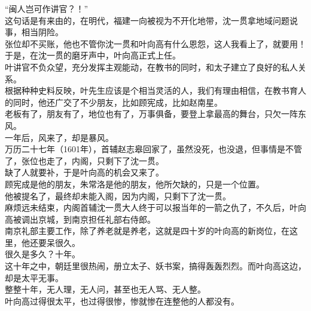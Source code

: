 \begin{multicols}{\theparacolNo}
“闽人岂可作讲官？！”\\

这句话是有来由的，在明代，福建一向被视为不开化地带，沈一贯拿地域问题说事，相当阴险。\\

张位却不买账，他也不管你沈一贯和叶向高有什么恩怨，这人我看上了，就要用！\\

于是，在沈一贯的磨牙声中，叶向高正式上任。\\

叶讲官不负众望，充分发挥主观能动，在教书的同时，和太子建立了良好的私人关系。\\

根据种种史料反映，叶先生应该是个相当灵活的人，我们有理由相信，在教书育人的同时，他还广交了不少朋友，比如顾宪成，比如赵南星。\\

老板有了，朋友有了，地位也有了，万事俱备，要登上拿最高的舞台，只欠一阵东风。\\

一年后，风来了，却是暴风。\\

万历二十七年（1601年），首辅赵志皋回家了，虽然没死，也没退，但事情是不管了，张位也走了，内阁，只剩下了沈一贯。\\

缺了人就要补，于是叶向高的机会又来了。\\

顾宪成是他的朋友，朱常洛是他的朋友，他所欠缺的，只是一个位置。\\

他被提名了，最终却未能入阁，因为内阁，只剩下了沈一贯。\\

麻烦远未结束，内阁首辅沈一贯大人终于可以报当年的一箭之仇了，不久后，叶向高被调出京城，到南京担任礼部右侍郎。\\

南京礼部主要工作，除了养老就是养老，这就是四十岁的叶向高的新岗位，在这里，他还要呆很久。\\

很久是多久？十年。\\

这十年之中，朝廷里很热闹，册立太子、妖书案，搞得轰轰烈烈。而叶向高这边，却是太平无事。\\

整整十年，无人理，无人问，甚至也无人骂、无人整。\\

叶向高过得很太平，也过得很惨，惨就惨在连整他的人都没有。\\


\end{multicols}
